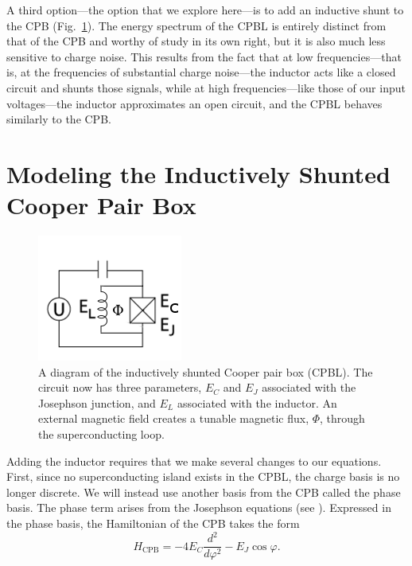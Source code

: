\documentclass[twocolumn]{revtex4}
\begin{document}
A third option---the option that we explore here---is to add an
inductive shunt to the CPB (Fig.~\ref{CPBL-circuit}). The energy
spectrum of the CPBL is entirely distinct from that of the CPB and
worthy of study in its own right, but it is also much less sensitive
to charge noise. This results from the fact that at low
frequencies---that is, at the frequencies of substantial charge
noise---the inductor acts like a closed circuit and shunts those
signals, while at high frequencies---like those of our input
voltages---the inductor approximates an open circuit, and the CPBL
behaves similarly to the CPB.

\section{Modeling the Inductively Shunted Cooper Pair Box}

\begin{figure}
  \includegraphics[width=.5\linewidth]{CPBL-circuit.png}
  \caption{ A diagram of the inductively shunted Cooper pair box
    (CPBL). The circuit now has three parameters, $E_C$ and $E_J$
    associated with the Josephson junction, and $E_L$ associated with
    the inductor. An external magnetic field creates a tunable
    magnetic flux, $\Phi$, through the superconducting loop.}
  \label{CPBL-circuit}
\end{figure}

Adding the inductor requires that we make several changes to our
equations. First, since no superconducting island exists in the CPBL,
the charge basis is no longer discrete. We will instead use another
basis from the CPB called the phase basis. The phase term arises from
the Josephson equations (see \cite{Feynman}). Expressed in the phase
basis, the Hamiltonian of the CPB takes the form
\begin{equation}
  H_{\text{CPB}} = -4E_C\frac{d^2}{d\varphi^2}-E_J\cos{\varphi}.
\end{equation}
\end{document}
